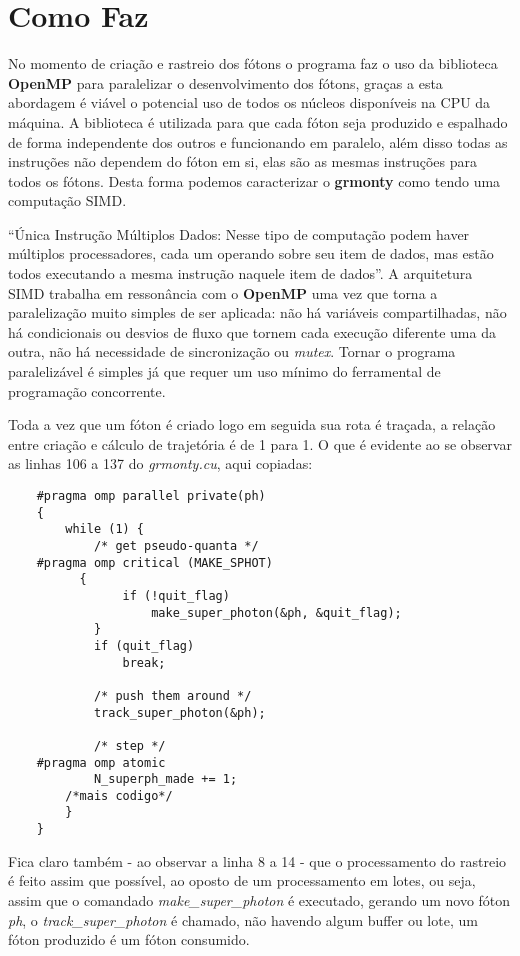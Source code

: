 \section{Como Faz}

  No momento de criação e rastreio dos fótons o programa faz o uso da biblioteca \textbf{OpenMP} para paralelizar o desenvolvimento dos fótons, graças a esta abordagem é viável o potencial uso de todos os núcleos disponíveis na CPU da máquina. A biblioteca é utilizada para que cada fóton seja produzido e espalhado de forma independente dos outros e funcionando em paralelo, além disso todas as instruções não dependem do fóton em si, elas são as mesmas instruções para todos os fótons. Desta forma podemos caracterizar o \textbf{grmonty} como tendo uma computação SIMD.

  ``Única Instrução Múltiplos Dados: Nesse tipo de computação podem haver múltiplos processadores, cada um operando sobre seu item de dados, mas estão todos executando a mesma instrução naquele item de dados''\citep[p.84, traduzido]{HCP:16}. A arquitetura SIMD trabalha em ressonância com o \textbf{OpenMP} uma vez que torna a paralelização muito simples de ser aplicada: não há variáveis compartilhadas, não há condicionais ou desvios de fluxo que tornem cada execução diferente uma da outra, não há necessidade de sincronização ou \textit{mutex}. Tornar o programa paralelizável é simples já que requer um uso mínimo do ferramental de programação concorrente.


  Toda a vez que um fóton é criado logo em seguida sua rota é traçada, a relação entre criação e cálculo de trajetória é de 1 para 1. O que é evidente ao se observar as linhas 106 a 137 do \textit{grmonty.cu}, aqui copiadas:

  \begin{lstlisting}
    #pragma omp parallel private(ph)
  	{
  		while (1) {
  			/* get pseudo-quanta */
    #pragma omp critical (MAKE_SPHOT)
  		  {
  				if (!quit_flag)
  					make_super_photon(&ph, &quit_flag);
  			}
  			if (quit_flag)
  				break;

  			/* push them around */
  			track_super_photon(&ph);

  			/* step */
    #pragma omp atomic
  			N_superph_made += 1;
        /*mais codigo*/
  		}
  	}
  \end{lstlisting}

  Fica claro também - ao observar a linha 8 a 14 - que o processamento do rastreio é feito assim que possível, ao oposto de um processamento em lotes, ou seja, assim que o comandado \textit{make\_super\_photon} é executado, gerando um novo fóton \textit{ph}, o  \textit{track\_super\_photon} é chamado, não havendo algum buffer ou lote, um fóton produzido é um fóton consumido.

